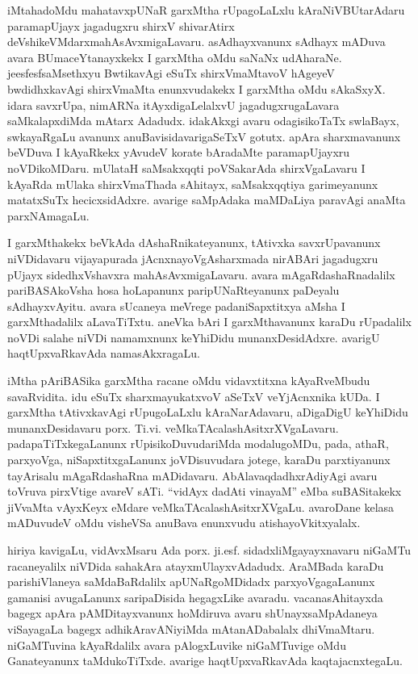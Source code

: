 iMtahadoMdu mahatavxpUNaR garxMtha rUpagoLaLxlu kAraNiVBUtarAdaru paramapUjayx jagadugxru shirxV shivarAtirx deVshikeVMdarx\break mahAsAvxmigaLavaru. asAdhayxvanunx sAdhayx mADuva avara BUmaceYtanayxkekx I garxMtha oMdu saNaNx udAharaNe. jeesfesf\break saMsethxyu BwtikavAgi eSuTx shirxVmaMtavoV hAgeyeV bwdidhxkavAgi shirxVmaMta enunxvudakekx I garxMtha oMdu sAkaSxyX. idara savxrUpa, nimARNa itAyxdigaLelalxvU jagadugxrugaLavara saMkalapxdiMda mAtarx Adadudx. idakAkxgi avaru odagisikoTaTx swlaBayx, swkayaRgaLu avanunx anuBavisidavarigaSeTxV gotutx. apAra sharxmavanunx beVDuva I kAyaRkekx yAvudeV korate bAradaMte paramapUjayxru noVDikoMDaru. mUlataH saMsakxqqti poVSakarAda shirxVgaLavaru I kAyaRda mUlaka shirxVmaThada sAhitayx, saMsakxqqtiya garimeyanunx matatxSuTx hecicxsidAdxre. avarige saMpAdaka maMDaLiya paravAgi anaMta parxNAmagaLu.

I garxMthakekx beVkAda dAshaRnikateyanunx, tAtivxka savxrUpavanunx niVDidavaru vijayapurada jAcnxnayoVgAsharxmada nirABAri \hbox{jagadugxru} pUjayx sidedhxVshavxra mahAsAvxmigaLavaru. avara mAgaRdashaRnadalilx pariBASAkoVsha hosa hoLapanunx paripUNaRteyanunx paDeyalu sAdhayxvAyitu. avara sUcaneya meVrege padaniSapxtitxya aMsha I garxMthadalilx aLavaTiTxtu. aneVka bAri I garxMthavanunx karaDu rUpadalilx noVDi salahe niVDi namamxnunx keYhiDidu munanxDesidAdxre. avarigU haqtUpxvaRkavAda namasAkxragaLu.

iMtha pAriBASika garxMtha racane oMdu vidavxtitxna kAyaRveMbudu savaRvidita. idu eSuTx sharxmayukatxvoV aSeTxV veYjAcnxnika kUDa. I garxMtha tAtivxkavAgi rUpugoLaLxlu kAraNarAdavaru, aDigaDigU keYhiDidu munanxDesidavaru porx. Ti.vi. veMkaTAcalashAsitxrXV\-gaLavaru. padapaTiTxkegaLanunx rUpisikoDuvudariMda modalugoMDu, pada, athaR, parxyoVga, niSapxtitxgaLanunx joVDisuvudara jotege, karaDu parxtiyanunx tayArisalu mAgaRdashaRna mADidavaru. AbAlavaqdadhxrAdiyAgi avaru toVruva pirxVtige avareV sATi. ``vidAyx dadAti vinayaM'' eMba suBASitakekx jiVvaMta vAyxKeyx eMdare veMkaTAcalashAsitxrXVgaLu. avaroDane kelasa mADuvudeV oMdu visheVSa anuBava enunxvudu atishayoVkitxyalalx. 

hiriya kavigaLu, vidAvxMsaru Ada porx. ji.esf. sidadxliMgayayxnavaru niGaMTu racaneyalilx niVDida sahakAra atayxmUlayxvAdadudx. AraMBada karaDu parishiVlaneya saMdaBaRdalilx apUNaRgoMDidadx parxyoVgagaLanunx gamanisi avugaLanunx saripaDisida hegagxLike avaradu. vacanasAhitayxda bagegx apAra pAMDitayxvanunx hoMdiruva avaru shUnayxsaMpAdaneya viSayagaLa bagegx adhikAra\-vANiyiMda mAtanADabalalx dhiVmaMtaru. niGaMTuvina kAyaRdalilx avara pAlogxLuvike niGaMTuvige oMdu Ganateyanunx taMdu\-koTiTxde. avarige haqtUpxvaRkavAda kaqtajacnxtegaLu.

